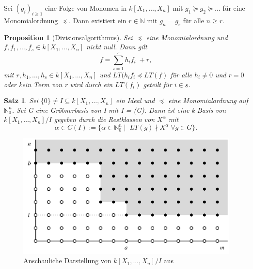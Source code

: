\documentclass{beamer}
\newtheorem{satz}{Satz}
\newtheorem{proposition}{Proposition}
\newcommand*{\R}{k[X_{1},\ldots,X_{n}]}
\begin{document}
\begin{frame}
	\begin{lemma} \label{1.2.4}
	Sei \((g_{i})_{i \geq 1}\) eine Folge von Monomen in \(\R\) mit \(g_{1} \succeq g_{2} \succeq
	\ldots\) für eine Monomialordnung \(\preceq\). Dann existiert ein \(r \in \mathbb{N}\) mit 
	\(g_{n} = g_{r}\) für alle \(n \geq r\). 
	\end{lemma}
\end{frame}

\begin{frame}
	\begin{proposition}[Divisionsalgorithmus] \label{1.2.5}
	Sei \(\preceq\) eine Monomialordnung und \(f, f_{1}, \ldots, f_{s} \in \R\) nicht null. Dann
	gilt \begin{displaymath} f = \sum_{i=1}^{s} h_{i}f_{i}\; + r, \end{displaymath} mit
	\(r, h_{1}, \ldots, h_{s} \in \R\) und \(LT(h_{i}f_{i} \preceq LT(f)\) für alle \(h_{i} \neq 0
	\) und \(r = 0\) oder kein Term von r wird durch ein \(LT(f_{i})\) geteilt für \(i \in
	\underline{s}\).
	\end{proposition}
\end{frame}

\begin{frame}
	\begin{satz} \label{1.2.8}
	Sei \(\{0\} \neq I \subseteq \R\) ein Ideal und \(\preceq\) eine Monomialordnung auf
	\(\mathbb{N}^{n}_{0}\). Sei G eine Gröbnerbasis von I mit I = (G). Dann ist eine k-Basis von 
	\(\R/I\) gegeben durch die Restklassen von \(X^{\alpha}\) mit
	\begin{displaymath}
	\alpha \in C(I) := \{\alpha \in \mathbb{N}^{n}_{0}\; |\;\; LT(g) \nmid X^{\alpha}\; \forall g 
	\in G\}.
	\end{displaymath}
	\end{satz}
\end{frame}

\begin{frame}
	\begin{figure}[ht]
		\centering
		\includegraphics[width=.75\linewidth]{Dots.png}
		\caption{Anschauliche Darstellung von \(\R/I\) aus \cite{CLOS}}
		\label{dots}
	\end{figure}
\end{frame}
\end{document}
